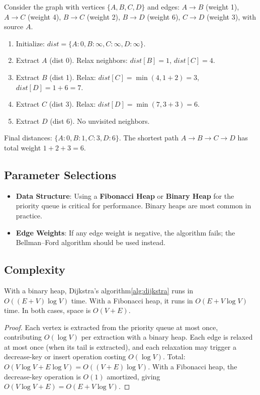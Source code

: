 \begin{example}\label{example:dijkstra_small}
Consider the graph with vertices $\{A, B, C, D\}$ and edges: $A \to B$ (weight 1), $A \to C$ (weight 4), $B \to C$ (weight 2), $B \to D$ (weight 6), $C \to D$ (weight 3), with source $A$.
\begin{enumerate}
  \item Initialize: $dist = \{A:0, B:\infty, C:\infty, D:\infty\}$.
  \item Extract $A$ (dist 0). Relax neighbors: $dist[B] = 1$, $dist[C] = 4$.
  \item Extract $B$ (dist 1). Relax: $dist[C] = \min(4, 1+2) = 3$, $dist[D] = 1+6 = 7$.
  \item Extract $C$ (dist 3). Relax: $dist[D] = \min(7, 3+3) = 6$.
  \item Extract $D$ (dist 6). No unvisited neighbors.
\end{enumerate}
Final distances: $\{A:0, B:1, C:3, D:6\}$. The shortest path $A \to B \to C \to D$ has total weight $1+2+3=6$.
\end{example}

\subsection{Parameter Selections}
\begin{itemize}
  \item \textbf{Data Structure}: Using a \textbf{Fibonacci Heap} or \textbf{Binary Heap} for the priority queue is critical for performance. Binary heaps are most common in practice.
  \item \textbf{Edge Weights}: If any edge weight is negative, the algorithm fails; the Bellman--Ford algorithm should be used instead.
\end{itemize}

\subsection{Complexity}
\begin{theorem}\label{thm:dijkstra_complexity}
With a binary heap, Dijkstra's algorithm\cref{alg:dijkstra} runs in $O((E + V) \log V)$ time. With a Fibonacci heap, it runs in $O(E + V \log V)$ time. In both cases, space is $O(V + E)$.
\end{theorem}
\begin{proof}
Each vertex is extracted from the priority queue at most once, contributing $O(\log V)$ per extraction with a binary heap. Each edge is relaxed at most once (when its tail is extracted), and each relaxation may trigger a decrease-key or insert operation costing $O(\log V)$. Total: $O(V \log V + E \log V) = O((V+E) \log V)$. With a Fibonacci heap, the decrease-key operation is $O(1)$ amortized, giving $O(V \log V + E) = O(E + V \log V)$.
\end{proof}


